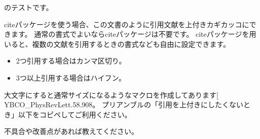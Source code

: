 \documentclass[dvipdfmx]{jsarticle}
\makeatletter
\def\@cite#1{\hspace*{.15em}\textsuperscript{[#1]}}	%
\def\Cite{\@ifnextchar[%
	{\@tempswatrue\let\@cite\@Cite\@citex}
	{\@tempswafalse\let\@cite\@Cite\@citex[]}}
\def\@Cite#1#2{\leavevmode %
	\ifnum\lastpenalty=\z@\penalty\@highpenalty\fi%
	[{\multiply\@highpenalty 3 #1%
		\if@tempswa,\penalty\@highpenalty\ #2\fi %
	}]\spacefactor\@m}
\makeatother
\begin{document}
	\BibTeX のテストです\cite{YBCO_PhysRevLett.58.908}。	
	
	citeパッケージを使う場合、この文書のように引用文献を上付きカギカッコにできます。
	通常の書式でよいならciteパッケージは不要です。
	citeパッケージを用いると、複数の文献を引用するときの書式なども自由に設定できます。
	\begin{itemize}\setlength{\itemsep}{3pt}
		\item 2つ引用する場合はカンマ区切り\cite{YBCO_PhysRevLett.58.908, Kittel_BA74778859}。
		\item 3つ以上引用する場合はハイフン\cite{YBCO_PhysRevLett.58.908, Kittel_BA74778859, website1}。
	\end{itemize}
	
	大文字にすると通常サイズになるようなマクロを作成してあります\Cite{YBCO_PhysRevLett.58.908}。	
	プリアンブルの「引用を上付きにしたくないとき」以下をコピペしてご利用ください。
	
	不具合や改善点があれば教えてください。
	
	
	\clearpage
\end{document}
